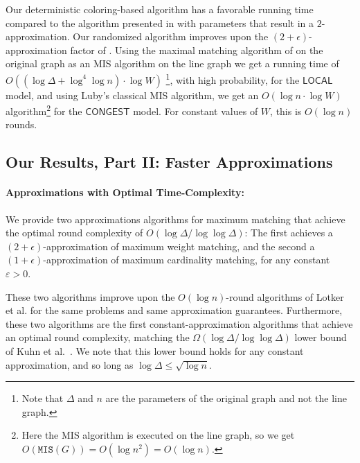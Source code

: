 \documentclass[11pt]{article}
\newcommand{\eps}{\varepsilon}
\newcommand{\Wmax}{W}%
\newcommand{\MIS}{\texttt{MIS}(G)}
\begin{document}
Our deterministic coloring-based algorithm has a favorable running time compared to the algorithm presented in \cite{even2015distributed} with parameters that result in a $2$-approximation. Our randomized algorithm improves upon the $(2+\epsilon)$-approximation factor of \cite{lotker2008improved}. Using the maximal matching algorithm of \cite{BarenboimEPS16} on the original graph as an MIS algorithm on the line graph we get a running time of $O((\log \Delta + \log^4\log n)\cdot \log \Wmax)$ \footnote{Note that $\Delta$ and $n$ are the parameters of the original graph and not the line graph.}, with high probability, for the $\mathsf{LOCAL}$ model, and using Luby's classical MIS algorithm\cite{luby1986simple}, we get an $O(\log n \cdot \log \Wmax)$ algorithm\footnote{Here the MIS algorithm is executed on the line graph, so we get $O(\MIS) = O(\log n^2) = O(\log n)$.} for the $\mathsf{CONGEST}$ model. For constant values of $\Wmax$, this is $O(\log n)$ rounds.

\subsection{Our Results, Part II: Faster Approximations}
\paragraph{Approximations with Optimal Time-Complexity:} We provide two approximations algorithms for maximum matching that achieve the optimal round complexity of $O(\log\Delta/\log \log \Delta)$: The first achieves a $(2+\epsilon)$-approximation of maximum weight matching, and the second a $(1+\epsilon)$-approximation of maximum cardinality matching, for any constant $\eps>0$.


These two algorithms improve upon the $O(\log n)$-round algorithms of Lotker et al.\cite{lotkerMatchingImproved} for the same problems and same approximation guarantees. Furthermore, these two algorithms are the first constant-approximation algorithms that achieve an optimal round complexity, matching the $\Omega(\log\Delta/\log \log \Delta)$ lower bound of Kuhn et al.~\cite{kuhn2006price}. We note that this lower bound holds for any constant approximation, and so long as $\log\Delta \leq \sqrt{\log n}$. 
\end{document}
